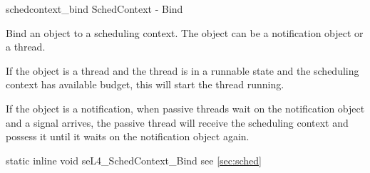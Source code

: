 %
%
%
%

\apidoc
{schedcontext_bind}
{SchedContext - Bind}
{Bind an object to a scheduling context. The object can be a notification object or a thread.
    
    If the object is a thread and the thread is in a runnable state and the scheduling context has available budget, this will start the thread running.
    
    If the object is a notification, when passive threads wait on the notification object and a signal arrives, the passive thread will receive the scheduling context and possess it until it waits on the notification object again.}
{static inline void seL4\_SchedContext\_Bind}
{
}
{\errorenumdesc}
{see \autoref{sec:sched}}
